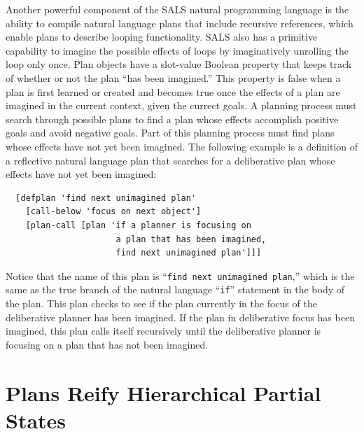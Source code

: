 Another powerful component of the SALS natural programming language is
the ability to compile natural language plans that include recursive
references, which enable plans to describe looping functionality.
SALS also has a primitive capability to imagine the possible effects
of loops by imaginatively unrolling the loop only once.  Plan objects
have a slot-value Boolean property that keeps track of whether or not
the plan ``has been imagined.''  This property is false when a plan is
first learned or created and becomes true once the effects of a plan
are imagined in the current context, given the currect goals.  A
planning process must search through possible plans to find a plan
whose effects accomplish positive goals and avoid negative goals.
Part of this planning process must find plans whose effects have not
yet been imagined.  The following example is a definition of a
reflective natural language plan that searches for a deliberative plan
whose effects have not yet been imagined:
\begin{samepage}
\begin{Verbatim}
  [defplan 'find next unimagined plan'
    [call-below 'focus on next object']
    [plan-call [plan 'if a planner is focusing on
                      a plan that has been imagined,
                      find next unimagined plan']]]
\end{Verbatim}
\end{samepage}
Notice that the name of this plan is ``{\tt{find next unimagined
    plan}},'' which is the same as the true branch of the natural
language ``{\tt{if}}'' statement in the body of the plan.  This plan
checks to see if the plan currently in the focus of the deliberative
planner has been imagined.  If the plan in deliberative focus has been
imagined, this plan calls itself recursively until the deliberative
planner is focusing on a plan that has not been imagined.

\section{Plans Reify Hierarchical Partial States}

